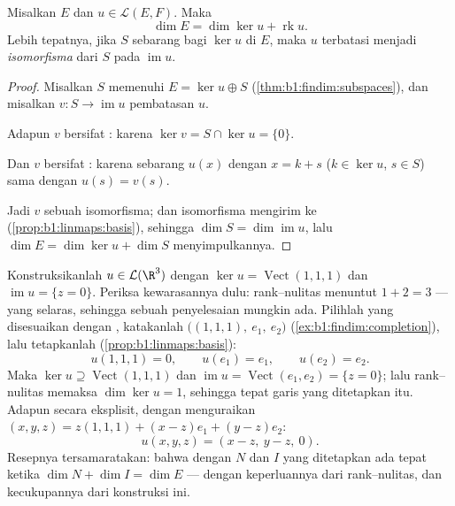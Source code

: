 \begin{theorem}\label{thm:b1:linmaps:ranknullity}
Misalkan $E$  dan $u \in \mathcal{L}(E, F)$.
Maka
\[
\dim E = \dim \ker u + \operatorname{rk} u .
\]
Lebih tepatnya, jika $S$ sebarang   bagi $\ker u$ di
$E$, maka $u$ terbatasi menjadi \emph{isomorfisma} dari $S$ pada
$\operatorname{im} u$.
\end{theorem}

\begin{proof}
Misalkan $S$ memenuhi $E = \ker u \oplus S$
(\cref{thm:b1:findim:subspaces}), dan misalkan $v \colon S \to
\operatorname{im} u$ pembatasan $u$.

Adapun $v$ bersifat : karena $\ker v = S \cap \ker u = \{0\}$.

Dan $v$ bersifat : karena sebarang $u(x)$ dengan $x = k + s$ ($k \in \ker u$, $s
\in S$) sama dengan $u(s) = v(s)$.

Jadi $v$ sebuah isomorfisma; dan isomorfisma mengirim  ke 
(\cref{prop:b1:linmaps:basis}), sehingga $\dim S = \dim\operatorname{im}
u$, lalu $\dim E = \dim\ker u + \dim S$ menyimpulkannya.
\end{proof}

\begin{example}
\label{ex:b1:linmaps:tospec}
Konstruksikanlah $u \in \mathcal{L}(\R^3)$ dengan $\ker u =
\operatorname{Vect}(1,1,1)$ dan $\operatorname{im} u = \{z =
0\}$. Periksa kewarasannya dulu: rank--nulitas menuntut $1 + 2 = 3$ ---
yang selaras, sehingga sebuah penyelesaian mungkin ada. Pilihlah  yang disesuaikan dengan
, katakanlah $\bigl((1,1,1),\ e_1,\ e_2\bigr)$
(\cref{ex:b1:findim:completion}), lalu tetapkanlah 
(\cref{prop:b1:linmaps:basis}):
\[
u(1,1,1) = 0, \qquad u(e_1) = e_1, \qquad u(e_2) = e_2 .
\]
Maka $\ker u \supseteq \operatorname{Vect}(1,1,1)$ dan
$\operatorname{im} u = \operatorname{Vect}(e_1, e_2) = \{z =
0\}$; lalu rank--nulitas memaksa $\dim\ker u = 1$, sehingga 
tepat garis yang ditetapkan itu. Adapun secara eksplisit, dengan menguraikan $(x, y, z)
= z(1,1,1) + (x - z)e_1 + (y - z)e_2$:
\[
u(x, y, z) = (x - z,\ y - z,\ 0).
\]
Resepnya tersamaratakan: bahwa  dengan  $N$
dan  $I$ yang ditetapkan ada tepat ketika $\dim N + \dim I = \dim E$
--- dengan keperluannya dari rank--nulitas, dan kecukupannya dari konstruksi
ini.
\end{example}


